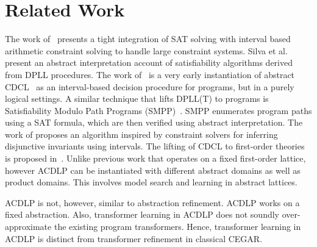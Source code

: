 \section{Related Work}
%
The work of~\cite{franzle} presents a tight integration of SAT solving
with interval based arithmetic constraint solving to handle large constraint
systems. 
%
Silva et al.~\cite{sas12} present an abstract interpretation account of 
satisfiability algorithms derived from DPLL procedures.  
%
The work of~\cite{tacas12} is a very early instantiation of abstract 
CDCL~\cite{sas12} as an interval-based decision procedure for programs, 
but in a purely logical settings.  
%
A similar technique that lifts DPLL(T) to programs is Satisfiability Modulo 
Path Programs (SMPP)~\cite{SMPP}. SMPP enumerates program paths using a SAT 
formula, which are then verified using abstract interpretation.  
%
The work of \cite{DBLP:conf/esop/MineBR16} proposes an algorithm inspired by 
constraint solvers for inferring disjunctive invariants using intervals.
%
The lifting of CDCL to first-order theories is proposed in~\cite{dpll,ndsmt}.
%
  Unlike previous work that operates on a fixed first-order lattice, however 
  ACDLP can be instantiated with different abstract domains as well as {product
  domains}.  This
  involves model search and learning in abstract lattices.  
  
  ACDLP is not, however,
  similar to abstraction refinement. ACDLP works on a fixed
  abstraction. Also, transformer learning in ACDLP does not soundly over-approximate
  the existing program transformers. Hence, transformer learning in ACDLP is
  distinct from transformer refinement in classical CEGAR. 

%
%
%
%

